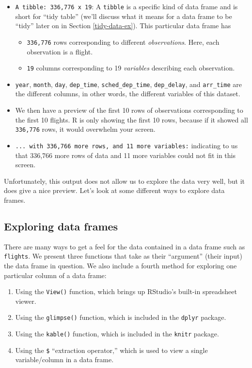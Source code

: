 \documentclass[]{book}
\providecommand{\tightlist}{%
  \setlength{\itemsep}{0pt}\setlength{\parskip}{0pt}}
\begin{document}
\begin{itemize}
\tightlist
\item
  \texttt{A\ tibble:\ 336,776\ x\ 19}: A \texttt{tibble} is a specific kind of data frame and is short for ``tidy table'' (we'll discuss what it means for a data frame to be ``tidy'' later on in Section \ref{tidy-data-ex}). This particular data frame has

  \begin{itemize}
  \tightlist
  \item
    \texttt{336,776} rows corresponding to different \emph{observations}. Here, each observation is a flight.
  \item
    \texttt{19} columns corresponding to 19 \emph{variables} describing each observation.
  \end{itemize}
\item
  \texttt{year}, \texttt{month}, \texttt{day}, \texttt{dep\_time}, \texttt{sched\_dep\_time}, \texttt{dep\_delay}, and \texttt{arr\_time} are the different columns, in other words, the different variables of this dataset.
\item
  We then have a preview of the first 10 rows of observations corresponding to the first 10 flights. R is only showing the first 10 rows, because if it showed all \texttt{336,776} rows, it would overwhelm your screen.
\item
  \texttt{...\ with\ 336,766\ more\ rows,\ and\ 11\ more\ variables:} indicating to us that 336,766 more rows of data and 11 more variables could not fit in this screen.
\end{itemize}

Unfortunately, this output does not allow us to explore the data very well, but it does give a nice preview. Let's look at some different ways to explore data frames.

\hypertarget{exploredataframes}{%
\subsection{Exploring data frames}\label{exploredataframes}}

There are many ways to get a feel for the data contained in a data frame such as \texttt{flights}. We present three functions that take as their ``argument'' (their input) the data frame in question. We also include a fourth method for exploring one particular column of a data frame:

\begin{enumerate}
\def\labelenumi{\arabic{enumi}.}
\tightlist
\item
  Using the \texttt{View()} function, which brings up RStudio's built-in spreadsheet viewer.
\item
  Using the \texttt{glimpse()} function, which is included in the \texttt{dplyr} package.
\item
  Using the \texttt{kable()} function, which is included in the \texttt{knitr} package.
\item
  Using the \texttt{\$} ``extraction operator,'' which is used to view a single variable/column in a data frame.
\end{enumerate}
\end{document}
